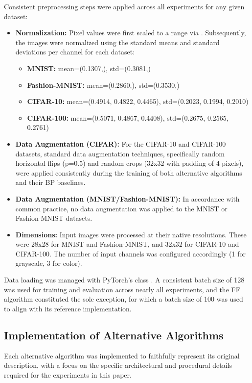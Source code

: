 Consistent preprocessing steps were applied across all experiments for any given dataset:
\begin{itemize}
    \item \textbf{Normalization:} Pixel values were first scaled to a range via . Subsequently, the images were normalized using the standard means and standard deviations per channel for each dataset:
        \begin{itemize}
            \item \textbf{MNIST:} mean=(0.1307,), std=(0.3081,)
            \item \textbf{Fashion-MNIST:} mean=(0.2860,), std=(0.3530,)
            \item \textbf{CIFAR-10:} mean=(0.4914, 0.4822, 0.4465), std=(0.2023, 0.1994, 0.2010)
            \item \textbf{CIFAR-100:} mean=(0.5071, 0.4867, 0.4408), std=(0.2675, 0.2565, 0.2761)
        \end{itemize}
    \item \textbf{Data Augmentation (CIFAR):} For the CIFAR-10 and CIFAR-100 datasets, standard data augmentation techniques, specifically random horizontal flips (p=0.5) and random crops (32x32 with padding of 4 pixels), were applied consistently during the training of both alternative algorithms and their BP baselines.
    \item \textbf{Data Augmentation (MNIST/Fashion-MNIST):} In accordance with common practice, no data augmentation was applied to the MNIST or Fashion-MNIST datasets.
    \item \textbf{Dimensions:} Input images were processed at their native resolutions. These were 28x28 for MNIST and Fashion-MNIST, and 32x32 for CIFAR-10 and CIFAR-100. The number of input channels was configured accordingly (1 for grayscale, 3 for color).
\end{itemize}

Data loading was managed with PyTorch's  class \cite{paszke2019pytorch}. A consistent batch size of 128 was used for training and evaluation across nearly all experiments, and the FF algorithm constituted the sole exception, for which a batch size of 100 was used to align with its reference implementation.

\subsection{Implementation of Alternative Algorithms}
\label{sec:methodology_alternatives}
Each alternative algorithm was implemented to faithfully represent its original description, with a focus on the specific architectural and procedural details required for the experiments in this paper.


